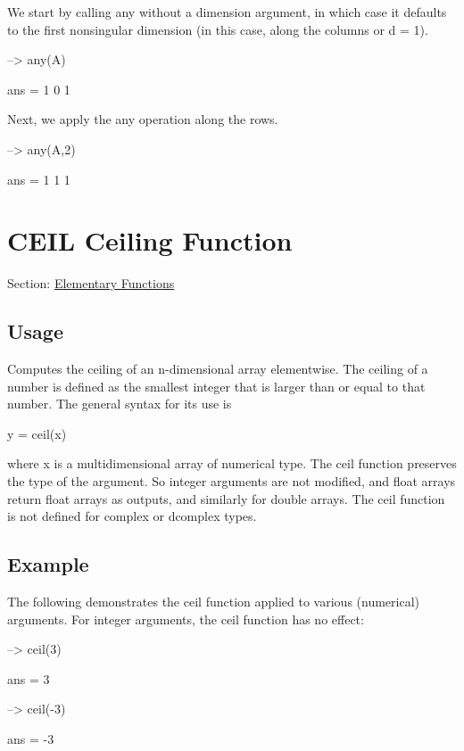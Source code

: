 We start by calling {\ttfamily any} without a dimension argument, in which case it defaults to the first nonsingular dimension (in this case, along the columns or {\ttfamily d = 1}).


\begin{DoxyVerbInclude}
--> any(A)

ans = 
 1 0 1 
\end{DoxyVerbInclude}


Next, we apply the {\ttfamily any} operation along the rows.


\begin{DoxyVerbInclude}
--> any(A,2)

ans = 
 1 
 1 
 1 
\end{DoxyVerbInclude}
 \hypertarget{elementary_ceil}{}\section{C\-E\-I\-L Ceiling Function}\label{elementary_ceil}
Section\-: \hyperlink{sec_elementary}{Elementary Functions} \hypertarget{vtkwidgets_vtkxyplotwidget_Usage}{}\subsection{Usage}\label{vtkwidgets_vtkxyplotwidget_Usage}
Computes the ceiling of an n-\/dimensional array elementwise. The ceiling of a number is defined as the smallest integer that is larger than or equal to that number. The general syntax for its use is \begin{DoxyVerb}   y = ceil(x)
\end{DoxyVerb}
 where {\ttfamily x} is a multidimensional array of numerical type. The {\ttfamily ceil} function preserves the type of the argument. So integer arguments are not modified, and {\ttfamily float} arrays return {\ttfamily float} arrays as outputs, and similarly for {\ttfamily double} arrays. The {\ttfamily ceil} function is not defined for {\ttfamily complex} or {\ttfamily dcomplex} types. \hypertarget{variables_struct_Example}{}\subsection{Example}\label{variables_struct_Example}
The following demonstrates the {\ttfamily ceil} function applied to various (numerical) arguments. For integer arguments, the ceil function has no effect\-:


\begin{DoxyVerbInclude}
--> ceil(3)

ans = 
 3 

--> ceil(-3)

ans = 
 -3 
\end{DoxyVerbInclude}


